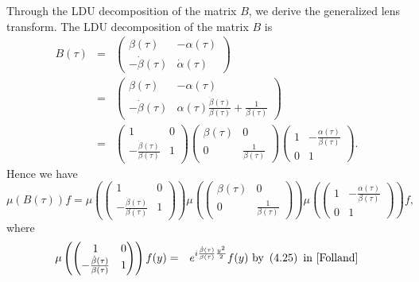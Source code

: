 \documentclass[reqno]{amsart}
\theoremstyle{plain}
\numberwithin{equation}{section}
\begin{document}
Through the LDU decomposition of the matrix $B$, we derive the generalized
lens transform. The LDU decomposition of the matrix $B$ is 
\begin{eqnarray*}
B(\tau ) &=&\begin{pmatrix}
\beta (\tau ) & -\alpha (\tau ) \\ 
-\dot{\beta}(\tau ) & \dot{\alpha}(\tau )\end{pmatrix}
\\
&=&\begin{pmatrix}
\beta (\tau ) & -\alpha (\tau ) \\ 
-\dot{\beta}(\tau ) & \alpha (\tau )\frac{\dot{\beta}(\tau )}{\beta (\tau )}+\frac{1}{\beta (\tau )}\end{pmatrix}
\\
&=&\begin{pmatrix}
1 & 0 \\ 
-\frac{\dot{\beta}(\tau )}{\beta (\tau )} & 1\end{pmatrix}\begin{pmatrix}
\beta (\tau ) & 0 \\ 
0 & \frac{1}{\beta (\tau )}\end{pmatrix}\begin{pmatrix}
1 & -\frac{\alpha (\tau )}{\beta (\tau )} \\ 
0 & 1\end{pmatrix}.
\end{eqnarray*}Hence we have\begin{equation}
\mu \left( B(\tau )\right) f=\mu \left( 
\begin{pmatrix}
1 & 0 \\ 
-\frac{\dot{\beta}(\tau )}{\beta (\tau )} & 1\end{pmatrix}\right) \mu \left( 
\begin{pmatrix}
\beta (\tau ) & 0 \\ 
0 & \frac{1}{\beta (\tau )}\end{pmatrix}\right) \mu \left( 
\begin{pmatrix}
1 & -\frac{\alpha (\tau )}{\beta (\tau )} \\ 
0 & 1\end{pmatrix}\right) f,  \label{equality:well-definedness}
\end{equation}where\begin{eqnarray*}
\mu \left( 
\begin{pmatrix}
1 & 0 \\ 
-\frac{\dot{\beta}(\tau )}{\beta (\tau )} & 1\end{pmatrix}\right) f(y) &=&e^{i\frac{\dot{\beta}(\tau )}{\beta (\tau )}\frac{y^{2}}{2}}f(y)\text{ by }\left( 4.25\right) \text{ in \cite{Folland}} \\

\end{eqnarray*}
\end{document}
